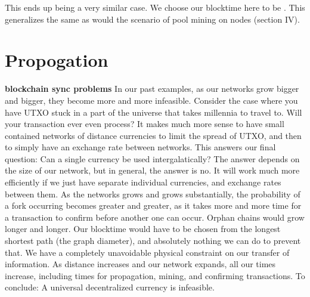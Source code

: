 \documentclass[conference]{IEEEtran}
\begin{document}
This ends up being a very similar case. We choose our blocktime here to be . This generalizes the same as would the scenario of pool mining on  nodes (section IV).

\section{Propogation}


\textbf{blockchain sync problems}
In our past examples, as our networks grow bigger and bigger, they become more and more infeasible. Consider the case where you have UTXO stuck in a part of the universe that takes millennia to travel to. Will your transaction ever even process? It makes much more sense to have small contained networks of distance currencies to limit the spread of UTXO, and then to simply have an exchange rate between networks. This answers our final question: Can a single currency be used intergalatically? The answer depends on the size of our network, but in general, the answer is no. It will work much more efficiently if we just have separate individual currencies, and exchange rates between them.
As the networks grows and grows substantially, the probability of a fork occurring becomes greater and greater, as it takes more and more time for a transaction to confirm before another one can occur. Orphan chains would grow longer and longer. Our blocktime would have to be chosen from the longest shortest path (the graph diameter), and  absolutely nothing we can do to prevent that. We have a completely unavoidable physical constraint on our transfer of information. As distance increases and our network expands, all our times increase, including times for propagation, mining, and confirming transactions. To conclude: A universal decentralized currency is infeasible. 
\end{document}
